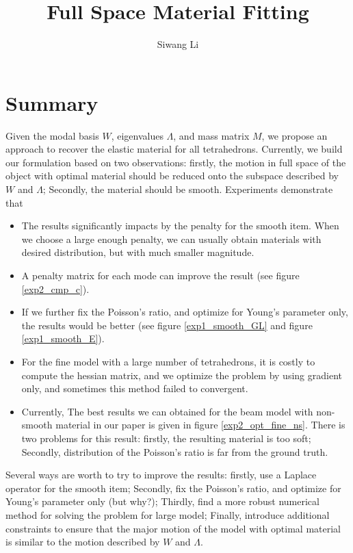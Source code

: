 \documentclass[9pt,twocolumn]{extarticle}
\author{Siwang Li}
\title{Full Space Material Fitting}
\begin{document}
\maketitle

\setlength{\parskip}{0.5ex}

\section{Summary} 
Given the modal basis $W$, eigenvalues $\Lambda$, and mass matrix ${M}$, we
propose an approach to recover the elastic material for all
tetrahedrons. Currently, we build our formulation based on two observations:
firstly, the motion in full space of the object with optimal material should be
reduced onto the subspace described by $W$ and $\Lambda$; Secondly, the material
should be smooth. Experiments demonstrate that
\begin{itemize}
\item The results significantly impacts by the penalty for the smooth item. When
  we choose a large enough penalty, we can usually obtain materials with desired
  distribution, but with much smaller magnitude. 
\item A penalty matrix for each mode can improve the result (see figure
  \ref{exp2_cmp_c}).
\item If we further fix the Poisson's ratio, and optimize for Young's parameter
  only, the results would be better (see figure \ref{exp1_smooth_GL} and figure
  \ref{exp1_smooth_E}).
\item For the fine model with a large number of tetrahedrons, it is costly to
  compute the hessian matrix, and we optimize the problem by using gradient
  only, and sometimes this method failed to convergent.
\item Currently, The best results we can obtained for the beam model with
  non-smooth material in our paper is given in figure
  \ref{exp2_opt_fine_ns}. There is two problems for this result: firstly, the
  resulting material is too soft; Secondly, distribution of the Poisson's ratio
  is far from the ground truth.
\end{itemize}

Several ways are worth to try to improve the results: firstly, use a Laplace
operator for the smooth item; Secondly, fix the Poisson's ratio, and optimize
for Young's parameter only (but why?); Thirdly, find a more robust numerical
method for solving the problem for large model; Finally, introduce additional
constraints to ensure that the major motion of the model with optimal material
is similar to the motion described by $W$ and $\Lambda$.
\end{document}
